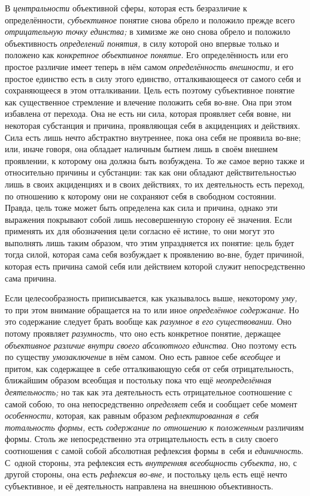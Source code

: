 В {\em центральности} объективной сферы, которая есть безразличие
к определённости, {\em субъективное}
понятие снова обрело и положило прежде всего
{\em отрицательную точку единства;}
в химизме же оно снова обрело и положило объективность
{\em определений понятия,}
в силу которой оно впервые только и положено как
{\em конкретное объективное понятие}.
Его определённость или его простое различие имеет теперь в
нём самом {\em определённость
внешности,} и его простое единство есть в силу этого
единство, отталкивающееся от самого себя и сохраняющееся в этом
отталкивании. Цель есть поэтому субъективное понятие как существенное
стремление и влечение положить себя во-вне. Она при этом избавлена от
перехода. Она не есть ни сила, которая проявляет себя вовне, ни некоторая
субстанция и причина, проявляющая себя в акциденциях и действиях. Сила есть
лишь нечто абстрактно внутреннее, пока она себя не проявила во-вне; или,
иначе говоря, она обладает наличным бытием лишь в своём внешнем проявлении,
к которому она должна быть возбуждена. То же самое верно также и
относительно причины и субстанции: так как они обладают действительностью
лишь в своих акциденциях и в своих действиях, то их деятельность есть
переход, по отношению к которому они не сохраняют себя в свободном
состоянии. Правда, цель тоже может быть определена как сила и причина,
однако эти выражения покрывают собой лишь несовершенную сторону её
значения. Если применять их для обозначения цели согласно её истине, то они
могут это выполнять лишь таким образом, что этим упраздняется их понятие:
цель будет тогда силой, которая сама себя возбуждает к проявлению во-вне,
будет причиной, которая есть причина самой себя или действием которой
служит непосредственно сама причина.

Если целесообразность приписывается, как указывалось выше,
некоторому {\em уму,} то
при этом внимание обращается на то или иное
{\em определённое содержание}.
Но это содержание следует брать вообще как
{\em разумное в его существовании}.
Оно потому проявляет
{\em разумность,} что оно
есть конкретное понятие, держащее
{\em объективное различие внутри своего
абсолютного единства}. Оно поэтому есть по существу
{\em умозаключение} в нём
самом. Оно есть равное себе
{\em всеобщее} и притом,
как содержащее в~себе отталкивающую себя от себя
отрицательность, ближайшим образом всеобщая и постольку пока
что ещё {\em неопределённая
деятельность;} но так как эта деятельность есть
отрицательное соотношение с самой собою, то она непосредственно
{\em определяет} себя и сообщает себе момент {\em особенности,}
которая, как равным образом {\em рефлектированная в~себя тотальность
формы,} есть {\em содержание по отношению к
положенным} различиям формы. Столь же непосредственно эта
отрицательность есть в силу своего соотношения с самой собой абсолютная
рефлексия формы в~себя и {\em единичность}.
С~одной стороны, эта рефлексия есть {\em внутренняя всеобщность субъекта,}
но, с другой стороны, она есть {\em рефлексия во-вне,} и
постольку цель есть ещё нечто субъективное, и её деятельность направлена на
внешнюю объективность.

